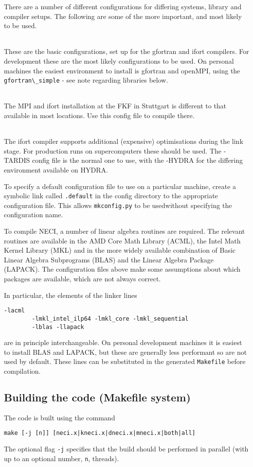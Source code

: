 \documentclass[a4paper,notitlepage,dvipsnames]{scrreprt}
\newcommand\codeitem[1]{\needspace{1.5\baselineskip}\item[\textnormal{\ttfamily #1 \nopagebreak}] \hfill \\ \nopagebreak}
\let\code\lstinline
\begin{document}
	There are a number of different configurations for
	differing systems, library and compiler setups. The following are some of
	the more important, and most likely to be used.
	\begin{description}
		\codeitem{gfortran\_simple, ifort\_simple}
			These are the basic configurations, set up for the gfortran and
			ifort compilers. For development these are the most likely
			configurations to be used. On personal machines the easiest
			environment to install is gfortran and openMPI, using the
			\code{gfortran\_simple} - see note regarding libraries below.
		\codeitem{fkf\_ifort}
			The MPI and ifort installation at the FKF in Stuttgart is different
			to that available in most locations. Use this config file to
			compile there.
		\codeitem{PC-ifort64-MPI-TARDIS, PC-ifort64-MPI-HYDRA}
			The ifort compiler supports additional (expensive) optimisations
			during the link stage. For production runs on supercomputers these
			should be used. The -TARDIS config file is the normal one to use,
			with the -HYDRA for the differing environment available on HYDRA.
	\end{description}
	To specify a default configuration file to use on a particular machine,
	create a symbolic link called \code{.default} in the config directory
	to the appropriate configuration file. This allows \code{mkconfig.py}
	to be usedwithout specifying the configuration name.

	To compile NECI, a number of linear algebra routines are required. The
	relevant routines are available in the AMD Core Math Library (ACML), the
	Intel Math Kernel Library (MKL) and in the more widely available
	combination of Basic Linear Algebra Subprograms (BLAS) and the Linear
	Algebra Package (LAPACK). The configuration files above make some
	assumptions about which packages are available, which are not always
	correct.

	In particular, the elements of the linker lines
	\begin{lstlisting}[gobble=4]
		-lacml
		-lmkl_intel_ilp64 -lmkl_core -lmkl_sequential
		-lblas -llapack
	\end{lstlisting}
	are in principle interchangeable. On personal development machines it is
	easiest to install BLAS and LAPACK, but these are generally less
	performant so are not used by default. These lines can be substituted in
	the generated \code{Makefile} before compilation.

\subsection{Building the code (Makefile system)}
	The code is built using the command
	\begin{lstlisting}[gobble=4]
		make [-j [n]] [neci.x|kneci.x|dneci.x|mneci.x|both|all]
	\end{lstlisting}
	The optional flag \code{-j} specifies that the build should be
	performed in parallel (with up to an optional number, \code{n},
	threads).
\end{document}
